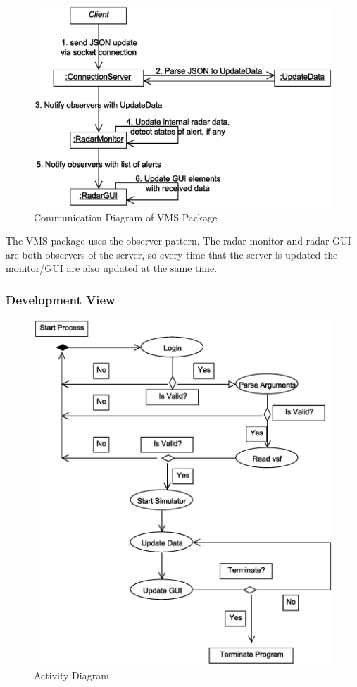 \documentclass{article}
\begin{document}
\break

\begin{figure}[!htb]
\caption{Communication Diagram of VMS Package}
\centering
\includegraphics[scale=0.6]{diagrams/vms-communication-diagram.eps}
\end{figure}

The VMS package uses the observer pattern. The radar monitor and radar GUI are both observers of the server, so every time that the server is updated the monitor/GUI are also updated at the same time.

\break

\subsubsection{Development View} %

\begin{figure}[!htb]
\caption{Activity Diagram}
\centering
\includegraphics[scale=0.6]{diagrams/activity-diagram.eps}
\end{figure}
\end{document}
